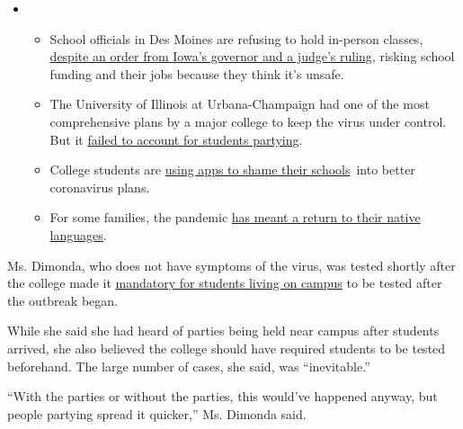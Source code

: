 \begin{itemize}
\item
  \begin{itemize}
  \tightlist
  \item
    School officials in Des Moines are refusing to hold in-person
    classes,
    \href{https://www.nytimes3xbfgragh.onion/2020/09/10/us/des-moines-school-opening-coronavirus.html?action=click\&pgtype=Article\&state=default\&region=MAIN_CONTENT_3\&context=storylines_keepup}{despite
    an order from Iowa's governor and a judge's ruling}, risking school
    funding and their jobs because they think it's unsafe.
  \item
    The University of Illinois at Urbana-Champaign had one of the most
    comprehensive plans by a major college to keep the virus under
    control. But it
    \href{https://www.nytimes3xbfgragh.onion/2020/09/10/health/university-illinois-covid.html?action=click\&pgtype=Article\&state=default\&region=MAIN_CONTENT_3\&context=storylines_keepup}{failed
    to account for students partying}.
  \item
    College students are
    \href{https://www.nytimes3xbfgragh.onion/2020/09/10/technology/coronavirus-quarantines-college.html?action=click\&pgtype=Article\&state=default\&region=MAIN_CONTENT_3\&context=storylines_keepup}{using
    apps to shame their schools}~into better coronavirus plans.
  \item
    For some families, the pandemic
    \href{https://www.nytimes3xbfgragh.onion/2020/09/10/parenting/family-second-language-coronavirus.html?action=click\&pgtype=Article\&state=default\&region=MAIN_CONTENT_3\&context=storylines_keepup}{has
    meant a return to their native languages}.
  \end{itemize}
\end{itemize}

Ms. Dimonda, who does not have symptoms of the virus, was tested shortly
after the college made it
\href{https://t.e2ma.net/message/1g9zcc/96qt6se}{mandatory for students
living on campus} to be tested after the outbreak began.

While she said she had heard of parties being held near campus after
students arrived, she also believed the college should have required
students to be tested beforehand. The large number of cases, she said,
was ``inevitable.''

``With the parties or without the parties, this would've happened
anyway, but people partying spread it quicker,'' Ms. Dimonda said.

